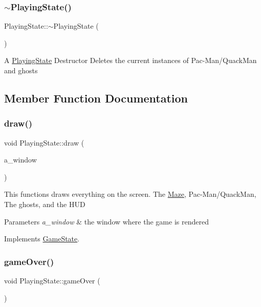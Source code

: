 \subsubsection{\texorpdfstring{$\sim$\+Playing\+State()}{~PlayingState()}}
{\footnotesize\ttfamily Playing\+State\+::$\sim$\+Playing\+State (\begin{DoxyParamCaption}{ }\end{DoxyParamCaption})}

A \hyperlink{class_playing_state}{Playing\+State} Destructor Deletes the current instances of Pac-\/\+Man/\+Quack\+Man and ghosts 

\subsection{Member Function Documentation}
\mbox{\label{class_playing_state_aa6c7033a5c734ba1ae4aae0905554d61}} 
\subsubsection{\texorpdfstring{draw()}{draw()}}
{\footnotesize\ttfamily void Playing\+State\+::draw (\begin{DoxyParamCaption}\item[{sf\+::\+Render\+Window \&}]{a\+\_\+window }\end{DoxyParamCaption})\hspace{0.3cm}{\ttfamily [virtual]}}

This functions draws everything on the screen. The \hyperlink{class_maze}{Maze}, Pac-\/\+Man/\+Quack\+Man, The ghosts, and the H\+UD


\begin{DoxyParams}{Parameters}
{\em a\+\_\+window} & the window where the game is rendered \\
\hline
\end{DoxyParams}


Implements \hyperlink{class_game_state_a5ffd5ce9acb7499ddef613e8836d1ef8}{Game\+State}.

\mbox{\label{class_playing_state_ac2093c243cc85bb767b27797060aab2c}} 
\subsubsection{\texorpdfstring{game\+Over()}{gameOver()}}
{\footnotesize\ttfamily void Playing\+State\+::game\+Over (\begin{DoxyParamCaption}{ }\end{DoxyParamCaption})}

